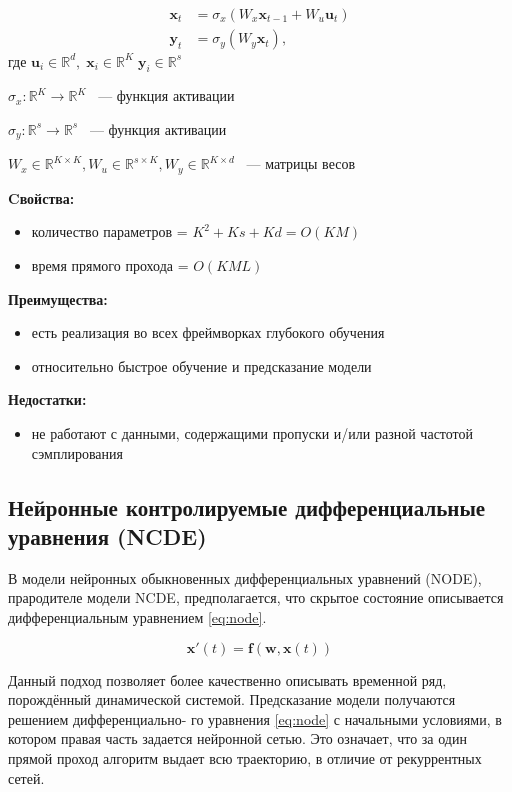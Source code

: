 \documentclass[a4paper, 12pt]{article}
\newcommand{\bx}{\mathbf{x}}
\newcommand{\by}{\mathbf{y}}
\newcommand{\bw}{\mathbf{w}}
\newcommand{\bff}{\mathbf{f}}
\newcommand{\bu}{\mathbf{u}}
\newcommand{\dR}{\mathds{R}}
\begin{document}
	\begin{equation}\label{eq:rnn}
		\begin{aligned}
			\bx_t &= \sigma_x(W_x \bx_{t-1} + W_u \bu_t) \\
			\by_t &= \sigma_y(W_y \bx_t),
		\end{aligned}
	\end{equation}
	$\text{где } \bu_i \in \dR^d, \; \bx_i \in \dR^K \; \by_i \in \dR^s$  
	
	$\sigma_x: \dR^K \rightarrow \dR^K$ ~--- функция активации  
	
	$\sigma_y: \dR^s \rightarrow \dR^s$ ~--- функция активации  
	
	$W_x \in \dR^{K \times K}, W_u \in \dR^{s \times K}, W_y \in \dR^{K \times d}$ ~--- матрицы весов

	\textbf{Cвойства:}
	\begin{itemize}
		\item количество параметров = $K^2 + Ks + Kd = O(KM)$
		\item время прямого прохода = $O(KML)$
	\end{itemize}

	\textbf{Преимущества:}
	\begin{itemize}
		\item есть реализация во всех фреймворках глубокого обучения
		\item относительно быстрое обучение и предсказание модели
	\end{itemize}

	\textbf{Недостатки:}
	\begin{itemize}
		\item не работают с данными, содержащими пропуски и/или разной частотой сэмплирования
	\end{itemize}

	\subsection{Нейронные контролируемые дифференциальные уравнения (NCDE)}
	В модели нейронных обыкновенных дифференциальных уравнений (NODE), прародителе модели NCDE, предполагается, что скрытое состояние описывается дифференциальным уравнением \ref{eq:node}.
	
	\begin{equation}\label{eq:node}
		\bx'(t) = \bff(\bw, \bx(t))
	\end{equation}

	Данный подход позволяет более качественно описывать временной ряд, порождённый динамической системой. Предсказание модели получаются решением дифференциально-
	го уравнения \ref{eq:node} с начальными условиями, в котором правая часть задается нейронной сетью. Это означает, что за один прямой проход алгоритм выдает всю траекторию, в отличие от рекуррентных сетей.
	
\end{document}
